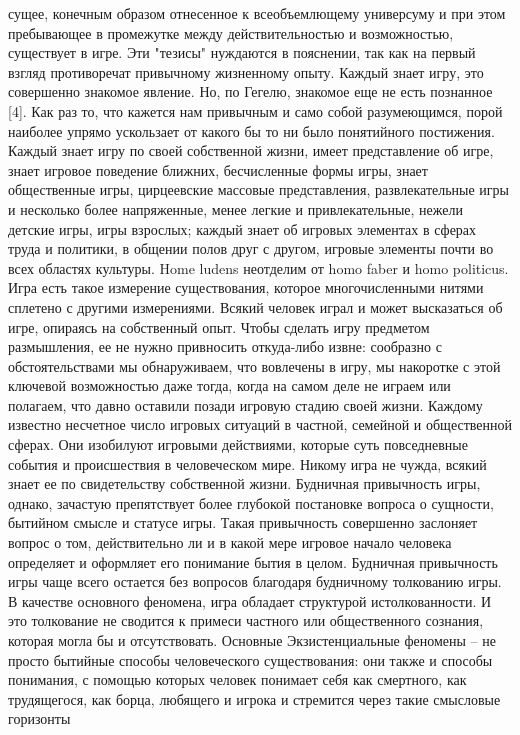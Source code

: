 \documentclass[12pt]{article}
\begin{document}
сущее, конечным образом отнесенное к всеобъемлющему универсуму и при этом пребывающее в промежутке
между действительностью и возможностью, существует в игре. Эти "тезисы" нуждаются в пояснении, так как
на первый взгляд противоречат привычному жизненному опыту. Каждый знает игру, это совершенно знакомое
явление. Но, по Гегелю, знакомое еще не есть познанное [4]. Как раз то, что кажется нам привычным и само
собой разумеющимся, порой наиболее упрямо ускользает от какого бы то ни было понятийного постижения.
Каждый  знает  игру  по  своей  собственной  жизни,  имеет  представление  об  игре,  знает  игровое  поведение
ближних,  бесчисленные  формы  игры,  знает  общественные  игры,  цирцеевские  массовые  представления,
развлекательные игры и несколько более напряженные, менее легкие и привлекательные, нежели детские игры,
игры взрослых; каждый знает об игровых элементах в сферах труда и политики, в общении полов друг с 
другом, игровые элементы почти во всех областях культуры. Home ludens неотделим от homo faber и homo
politicus. Игра есть такое измерение существования, которое многочисленными нитями сплетено с другими
измерениями.  Всякий человек  играл и  может  высказаться  об  игре,  опираясь на собственный опыт. Чтобы
сделать  игру  предметом  размышления,  ее  не  нужно  привносить  откуда-либо  извне:  сообразно  с
обстоятельствами мы обнаруживаем, что вовлечены в игру, мы накоротке с этой ключевой возможностью даже
тогда, когда на самом деле не играем или полагаем, что давно оставили позади игровую стадию своей жизни.
Каждому  известно  несчетное  число  игровых  ситуаций  в  частной,  семейной  и  общественной  сферах.  Они
изобилуют игровыми действиями, которые суть повседневные события и происшествия в человеческом мире.
Никому игра не чужда, всякий знает ее по свидетельству собственной жизни. Будничная привычность игры,
однако, зачастую препятствует более глубокой постановке вопроса о сущности, бытийном смысле и статусе
игры. Такая привычность совершенно заслоняет вопрос о том, действительно ли и в какой мере игровое начало
человека определяет и оформляет его понимание бытия в целом. Будничная привычность игры чаще всего
остается без вопросов благодаря будничному толкованию игры. В качестве основного феномена, игра обладает
структурой истолкованности. И это толкование не сводится к примеси частного или общественного сознания,
которая могла бы и отсутствовать. Основные Экзистенциальные феномены -- не просто бытийные способы
человеческого существования: они также и способы понимания, с помощью которых человек понимает себя как
смертного, как трудящегося, как борца, любящего и игрока и стремится через такие смысловые горизонты
\end{document}
